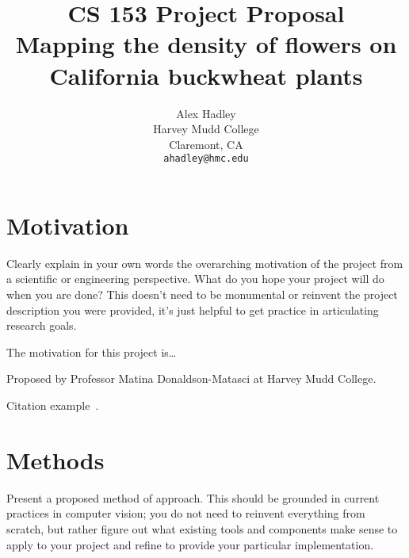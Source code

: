 \documentclass[10pt,twocolumn,letterpaper]{article}
\begin{document}
\title{CS 153 Project Proposal\\
Mapping the density of flowers on California buckwheat plants
}

\author{Alex Hadley\\
Harvey Mudd College\\
Claremont, CA\\
{\tt\small ahadley@hmc.edu}
}
\maketitle


\section{Motivation}

Clearly explain in your own words the overarching motivation of the project from a scientific or engineering perspective. What do you hope your project will do when you are done? This doesn't need to be monumental or reinvent the project description you were provided, it's just helpful to get practice in articulating research goals.

The motivation for this project is\dots

Proposed by Professor Matina Donaldson-Matasci at Harvey Mudd College.

Citation example~\cite{Alpher03}.

\section{Methods}

Present a proposed method of approach. This should be grounded in current practices in computer vision; you do not need to reinvent everything from scratch, but rather figure out what existing tools and components make sense to apply to your project and refine to provide your particular implementation.
\end{document}
